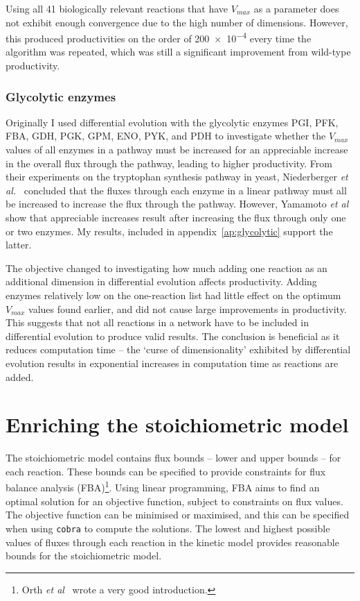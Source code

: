\documentclass[parskip=full]{scrreprt}
\begin{document}
Using all 41 biologically relevant reactions that have $V_{max}$ as a parameter does not exhibit enough convergence due to the high number of dimensions. However, this produced productivities on the order of \num{200e-4} every time the algorithm was repeated, which was still a significant improvement from wild-type productivity.
\subsection{Glycolytic enzymes}
\label{ssec:glycolytic}

Originally I used differential evolution with the glycolytic enzymes PGI, PFK, FBA, GDH, PGK, GPM, ENO, PYK, and PDH to investigate whether the $V_{max}$ values of all enzymes in a pathway must be increased for an appreciable increase in the overall flux through the pathway, leading to higher productivity. From their experiments on the tryptophan synthesis pathway in yeast, Niederberger \emph{et al.}~\cite{niederberger_strategy_1992} concluded that the fluxes through each enzyme in a linear pathway must all be increased to increase the flux through the pathway. However, Yamamoto \emph{et al}~\cite{yamamoto_overexpression_2012} show that appreciable increases result after increasing the flux through only one or two enzymes. My results, included in appendix~\ref{ap:glycolytic} support the latter.

The objective changed to investigating how much adding one reaction as an additional dimension in differential evolution affects productivity. Adding enzymes relatively low on the one-reaction list had little effect on the optimum $V_{max}$ values found earlier, and did not cause large improvements in productivity. This suggests that not all reactions in a network have to be included in differential evolution to produce valid results. The conclusion is beneficial as it reduces computation time -- the `curse of dimensionality' exhibited by differential evolution results in exponential increases in computation time as reactions are added.

\chapter{Enriching the stoichiometric model}
\label{ch:stoich}

The stoichiometric model contains flux bounds -- lower and upper bounds -- for each reaction. These bounds can be specified to provide constraints for flux balance analysis (FBA)\footnote{Orth \emph{et al}~\cite{orth_what_2010} wrote a very good introduction.}. Using linear programming, FBA aims to find an optimal solution for an objective function, subject to constraints on flux values. The objective function can be minimised or maximised, and this can be specified when using \texttt{cobra} to compute the solutions. The lowest and highest possible values of fluxes through each reaction in the kinetic model provides reasonable bounds for the stoichiometric model.
\end{document}
